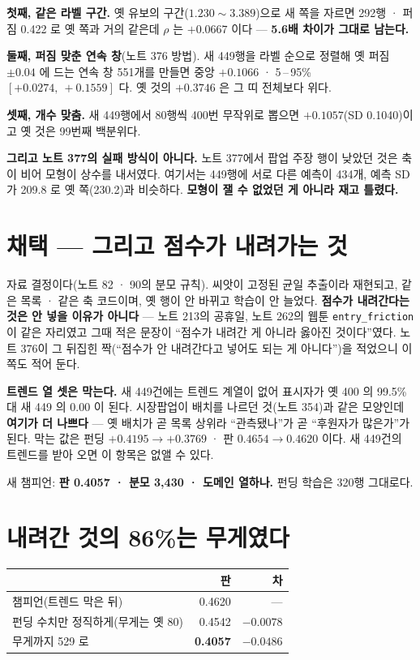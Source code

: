 \documentclass[11pt]{article}
\begin{document}
\textbf{첫째, 같은 라벨 구간.} 옛 유보의 구간($1.230 \sim 3.389$)으로
새 쪽을 자르면 292행 · 퍼짐 0.422 로 옛 쪽과 거의 같은데 $\rho$ 는
$+0.0667$ 이다 --- \textbf{5.6배 차이가 그대로 남는다.}

\textbf{둘째, 퍼짐 맞춘 연속 창}(노트 376 방법). 새 449행을 라벨 순으로
정렬해 옛 퍼짐 $\pm0.04$ 에 드는 연속 창 551개를 만들면 중앙 $+0.1066$ ·
5\,--\,95\% $[+0.0274,\ +0.1559]$ 다. 옛 것의 $+0.3746$ 은 그 띠 전체보다
위다.

\textbf{셋째, 개수 맞춤.} 새 449행에서 80행씩 400번 무작위로 뽑으면
$+0.1057$(SD 0.1040)이고 옛 것은 99번째 백분위다.

\textbf{그리고 노트 377의 실패 방식이 아니다.} 노트 377에서 팝업 주장
행이 낮았던 것은 축이 비어 모형이 상수를 내서였다. 여기서는 449행에
서로 다른 예측이 434개, 예측 SD가 209.8 로 옛 쪽(230.2)과 비슷하다.
\textbf{모형이 잴 수 없었던 게 아니라 재고 틀렸다.}

\section{채택 --- 그리고 점수가 내려가는 것}

자료 결정이다(노트 82 · 90의 분모 규칙). 씨앗이 고정된 균일 추출이라
재현되고, 같은 목록 · 같은 축 코드이며, 옛 행이 안 바뀌고 학습이 안 늘었다.
\textbf{점수가 내려간다는 것은 안 넣을 이유가 아니다} --- 노트 213의
공휴일, 노트 262의 웹툰 \texttt{entry\_friction} 이 같은 자리였고 그때
적은 문장이 ``점수가 내려간 게 아니라 옳아진 것이다''였다. 노트 376이
그 뒤집힌 짝(``점수가 안 내려간다고 넣어도 되는 게 아니다'')을 적었으니
이쪽도 적어 둔다.

\textbf{트렌드 열 셋은 막는다.} 새 449건에는 트렌드 계열이 없어 표시자가
옛 400 의 99.5\% 대 새 449 의 0.00 이 된다. 시장팝업이 배치를 나르던
것(노트 354)과 같은 모양인데 \textbf{여기가 더 나쁘다} --- 옛 배치가 곧
목록 상위라 ``관측됐나''가 곧 ``후원자가 많은가''가 된다. 막는 값은
펀딩 $+0.4195 \to +0.3769$ · 판 $0.4654 \to 0.4620$ 이다. 새 449건의
트렌드를 받아 오면 이 항목은 없앨 수 있다.

새 챔피언: \textbf{판 0.4057 · 분모 3,430 · 도메인 열하나.} 펀딩 학습은
320행 그대로다.

\section{내려간 것의 86\%는 무게였다}

\begin{center}
\begin{tabular}{lrr}
\hline
 & 판 & 차 \\
\hline
챔피언(트렌드 막은 뒤) & 0.4620 & --- \\
펀딩 수치만 정직하게(무게는 옛 80) & 0.4542 & $-0.0078$ \\
무게까지 529 로 & \textbf{0.4057} & $\mathbf{-0.0486}$ \\
\hline
\end{tabular}
\end{center}
\end{document}
